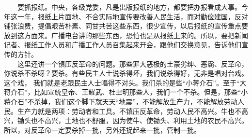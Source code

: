\documentclass[cn,11pt,chinese]{elegantbook}
\begin{document}
　　要抓报纸。中央，各级党委，凡是出版报纸的地方，都要把办报看成大事。今年这一年，报纸上片面地、不合实际地宣传要改善人民生活，而对勤俭建国，反对铺张浪费，提倡艰苦朴素、同甘共苦这些东西，很少宣传，以后报纸的宣传重点要放到这方面来。广播电台讲的那些东西，恐怕也是从报纸上来的。所以，要把新闻记者、报纸工作人员和广播工作人员召集起来开会，跟他们交换意见，告诉他们宣传的方针。\\
　　这里还讲一个镇压反革命的问题。那些罪大恶极的土豪劣绅、恶霸、反革命，你说杀不杀呀？要杀。有些民主人士说杀得坏，我们说杀得好，无非是唱对台戏。 这个戏， 我们就是老跟民主人士唱得不对头。我们杀的是些“小蒋介石”。至于“大蒋介石”，比如宣统皇帝、王耀武、杜聿明那些人，我们一个不杀。但是，那些“小蒋介石”不杀掉，我们这个脚下就天天“地震”，不能解放生产力，不能解放劳动人民。生产力就是两项：劳动者和工具。不镇压反革命，劳动人民不高兴。牛也不高兴，锄头也不高兴，土地也不舒服，因为使牛、使锄头、利用土地的农民不高兴。所以，对反革命一定要杀掉一批，另外还捉起来一批，管制一批。\\
\end{document}

